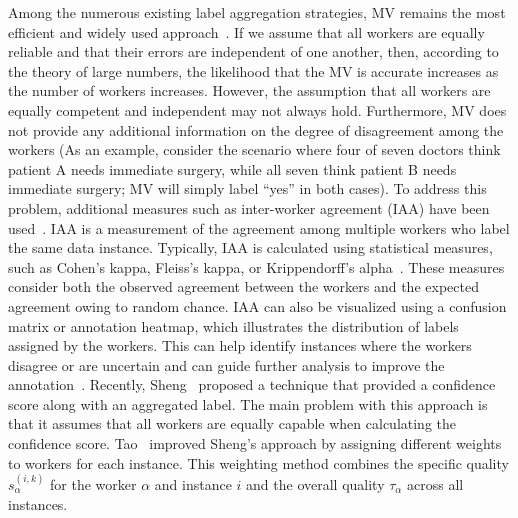 \documentclass[default]{bst/sn-jnl_mine}%
\begin{document}
Among the numerous existing label aggregation strategies, MV remains the most efficient and widely used approach~\cite{tao_Label_2020}. If we assume that all workers are equally reliable and that their errors are independent of one another, then, according to the theory of large numbers, the likelihood that the MV is accurate increases as the number of workers increases. However, the assumption that all workers are equally competent and independent may not always hold. Furthermore, MV does not provide any additional information on the degree of disagreement among the workers (As an example, consider the scenario where four of seven doctors think patient A needs immediate surgery, while all seven think patient B needs immediate surgery; MV will simply label ``yes'' in both cases).
To address this problem, additional measures such as inter-worker agreement (IAA) have been used~\cite{artstein_InterAnnotator_2017}. IAA is a measurement of the agreement among multiple workers who label the same data instance. Typically, IAA is calculated using statistical measures, such as Cohen's kappa, Fleiss's kappa, or Krippendorff's alpha~\cite{krippendorff_Content_2018}. These measures consider both the observed agreement between the workers and the expected agreement owing to random chance. IAA can also be visualized using a confusion matrix or annotation heatmap, which illustrates the distribution of labels assigned by the workers. This can help identify instances where the workers disagree or are uncertain and can guide further analysis to improve the annotation~\cite{carletta_Assessing_1996}.
Recently, Sheng~\cite{sheng_Majority_2019} proposed a technique that provided a confidence score along with an aggregated label. The main problem with this approach is that it assumes that all workers are equally capable when calculating the confidence score. Tao~\cite{tao_Label_2020} improved Sheng's approach by assigning different weights to workers for each instance. This weighting method combines the specific quality $s_\alpha^{(i,k)} $ for the worker $\alpha $ and instance $i $ and the overall quality $\tau_\alpha$ across all instances.
\end{document}

